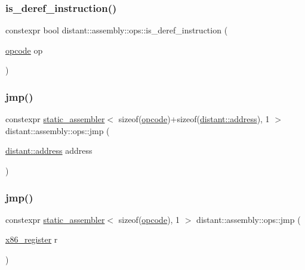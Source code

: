 \subsubsection{\texorpdfstring{is\+\_\+deref\+\_\+instruction()}{is\_deref\_instruction()}}
{\footnotesize\ttfamily constexpr bool distant\+::assembly\+::ops\+::is\+\_\+deref\+\_\+instruction (\begin{DoxyParamCaption}\item[{\mbox{\hyperlink{namespacedistant_1_1assembly_a64d7b047d9e3df1ac04919f7c4f8f6fa}{opcode}}}]{op }\end{DoxyParamCaption})\hspace{0.3cm}{\ttfamily [noexcept]}}

\mbox{\label{namespacedistant_1_1assembly_1_1ops_a4fa2e61621d5f5420f07ef30e92ed0a1}} 
\subsubsection{\texorpdfstring{jmp()}{jmp()}\hspace{0.1cm}{\footnotesize\ttfamily [1/2]}}
{\footnotesize\ttfamily constexpr \mbox{\hyperlink{classdistant_1_1assembly_1_1static__assembler}{static\+\_\+assembler}}$<$ sizeof(\mbox{\hyperlink{namespacedistant_1_1assembly_a64d7b047d9e3df1ac04919f7c4f8f6fa}{opcode}})+sizeof(\mbox{\hyperlink{namespacedistant_a9d7aa6e07cb2f50321e29c209f9a7886}{distant\+::address}}), 1 $>$ distant\+::assembly\+::ops\+::jmp (\begin{DoxyParamCaption}\item[{\mbox{\hyperlink{namespacedistant_a9d7aa6e07cb2f50321e29c209f9a7886}{distant\+::address}}}]{address }\end{DoxyParamCaption})\hspace{0.3cm}{\ttfamily [noexcept]}}

\mbox{\label{namespacedistant_1_1assembly_1_1ops_a6e45c6dc95f180d85547435e56e037bb}} 
\subsubsection{\texorpdfstring{jmp()}{jmp()}\hspace{0.1cm}{\footnotesize\ttfamily [2/2]}}
{\footnotesize\ttfamily constexpr \mbox{\hyperlink{classdistant_1_1assembly_1_1static__assembler}{static\+\_\+assembler}}$<$ sizeof(\mbox{\hyperlink{namespacedistant_1_1assembly_a64d7b047d9e3df1ac04919f7c4f8f6fa}{opcode}}), 1 $>$ distant\+::assembly\+::ops\+::jmp (\begin{DoxyParamCaption}\item[{\mbox{\hyperlink{namespacedistant_1_1assembly_a873d3faa0111fc5605de36beaaaafb3e}{x86\+\_\+register}}}]{r }\end{DoxyParamCaption})\hspace{0.3cm}{\ttfamily [noexcept]}}

